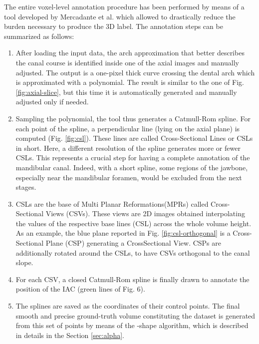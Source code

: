 The entire voxel-level annotation procedure has been performed by means of a
tool developed by Mercadante et al. which allowed to drastically reduce the
burden necessary to produce the 3D label.
The annotation steps can be summarized as follows:
\begin{enumerate}
  \item{After loading the input data, the arch approximation that better
    describes the canal course is identified inside one of the axial images and
    manually adjusted. The output is a one-pixel thick curve crossing the dental
    arch which is approximated with a polynomial. The result is similar to the
    one of Fig. \ref{fig:axial-slice}, but this time it is automatically
    generated and manually adjusted only if needed.}

  \item{Sampling the polynomial, the tool thus generates a Catmull-Rom spline.
    For each point of the spline, a perpendicular line (lying on the axial
    plane) is computed (Fig. \ref{fig:csl}). These lines are called
    Cross-Sectional Lines or CSLs in short. Here, a different resolution of the
    spline generates more or fewer CSLs. This represents a crucial step for
    having a complete annotation of the mandibular canal. Indeed, with a short
    spline, some regions of the jawbone, especially near the mandibular foramen,
    would be excluded from the next stages.}

  \item{CSLs are the base of Multi Planar Reformations(MPRs) called
    Cross-Sectional Views (CSVs). These views are 2D images obtained
    interpolating the values of the respective base lines (CSL) across the whole
    volume height. As an example, the blue plane reported in Fig.
    \ref{fig:csl-orthogonal} is a Cross-Sectional Plane (CSP) generating a
    CrossSectional View. CSPs are additionally rotated around the CSLs, to have
    CSVs orthogonal to the canal slope.}

  \item{For each CSV, a closed Catmull-Rom spline is finally drawn to annotate
    the position of the IAC (green lines of Fig. 6).}

  \item{The splines are saved as the coordinates of their control points. The
    final smooth and precise ground-truth volume constituting the dataset is
    generated from this set of points by means of the \textalpha-shape
    algorithm, which is described in details in the Section \ref{sec:alpha}.}
\end{enumerate}

